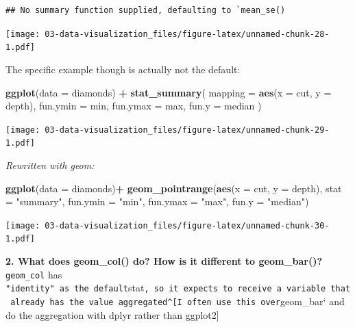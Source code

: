 \documentclass[]{book}
\newenvironment{Shaded}{\begin{snugshade}}{\end{snugshade}}
\newcommand{\DataTypeTok}[1]{\textcolor[rgb]{0.13,0.29,0.53}{#1}}
\newcommand{\KeywordTok}[1]{\textcolor[rgb]{0.13,0.29,0.53}{\textbf{#1}}}
\newcommand{\NormalTok}[1]{#1}
\newcommand{\OperatorTok}[1]{\textcolor[rgb]{0.81,0.36,0.00}{\textbf{#1}}}
\newcommand{\StringTok}[1]{\textcolor[rgb]{0.31,0.60,0.02}{#1}}
\theoremstyle{definition}
\theoremstyle{definition}
\theoremstyle{definition}
\theoremstyle{remark}
\begin{document}
\begin{verbatim}
## No summary function supplied, defaulting to `mean_se()
\end{verbatim}

\texttt{[image: 03-data-visualization\_files/figure-latex/unnamed-chunk-28-1.pdf]}

The specific example though is actually not the default:

\begin{Shaded}
\begin{Highlighting}[]
\KeywordTok{ggplot}\NormalTok{(}\DataTypeTok{data =}\NormalTok{ diamonds) }\OperatorTok{+}\StringTok{ }
\StringTok{  }\KeywordTok{stat_summary}\NormalTok{(}
    \DataTypeTok{mapping =} \KeywordTok{aes}\NormalTok{(}\DataTypeTok{x =}\NormalTok{ cut, }\DataTypeTok{y =}\NormalTok{ depth),}
    \DataTypeTok{fun.ymin =}\NormalTok{ min,}
    \DataTypeTok{fun.ymax =}\NormalTok{ max,}
    \DataTypeTok{fun.y =}\NormalTok{ median}
\NormalTok{  )}
\end{Highlighting}
\end{Shaded}

\texttt{[image: 03-data-visualization\_files/figure-latex/unnamed-chunk-29-1.pdf]}

\emph{Rewritten with geom:}

\begin{Shaded}
\begin{Highlighting}[]
\KeywordTok{ggplot}\NormalTok{(}\DataTypeTok{data =}\NormalTok{ diamonds)}\OperatorTok{+}
\StringTok{  }\KeywordTok{geom_pointrange}\NormalTok{(}\KeywordTok{aes}\NormalTok{(}\DataTypeTok{x =}\NormalTok{ cut, }\DataTypeTok{y =}\NormalTok{ depth), }
                  \DataTypeTok{stat =} \StringTok{"summary"}\NormalTok{, }
                  \DataTypeTok{fun.ymin =} \StringTok{"min"}\NormalTok{,}
                  \DataTypeTok{fun.ymax =} \StringTok{"max"}\NormalTok{, }
                  \DataTypeTok{fun.y =} \StringTok{"median"}\NormalTok{)}
\end{Highlighting}
\end{Shaded}

\texttt{[image: 03-data-visualization\_files/figure-latex/unnamed-chunk-30-1.pdf]}

\textbf{2. What does geom\_col() do? How is it different to
geom\_bar()?}\\
\texttt{geom\_col} has
\texttt{"identity"\ as\ the\ default}stat\texttt{,\ so\ it\ expects\ to\ receive\ a\ variable\ that\ already\ has\ the\ value\ aggregated\^{}{[}I\ often\ use\ this\ over}geom\_bar`
and do the aggregation with dplyr rather than ggplot2{]}
\end{document}
